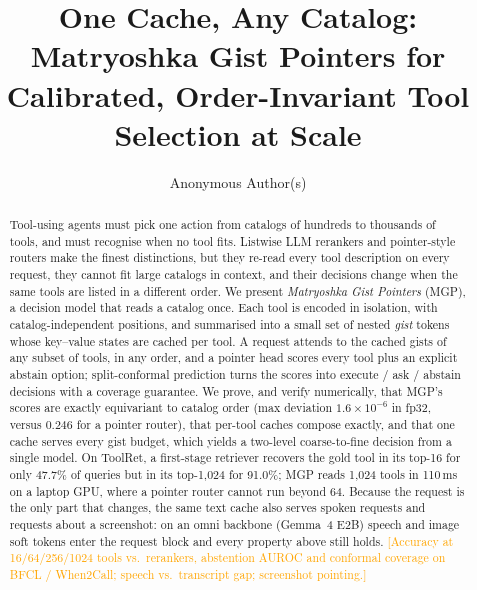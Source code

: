 \documentclass[sigconf,review,anonymous]{acmart}
\newcommand{\pending}[1]{\textcolor{orange}{[#1]}}
\newcommand{\method}{MGP}
\begin{document}
\title{One Cache, Any Catalog: Matryoshka Gist Pointers for Calibrated, Order-Invariant Tool Selection at Scale}

\author{Anonymous Author(s)}

\begin{abstract}
Tool-using agents must pick one action from catalogs of hundreds to thousands of tools, and must recognise when no tool fits.
Listwise LLM rerankers and pointer-style routers make the finest distinctions, but they re-read every tool description on every request, they cannot fit large catalogs in context, and their decisions change when the same tools are listed in a different order.
We present \emph{Matryoshka Gist Pointers} (\method{}), a decision model that reads a catalog once.
Each tool is encoded in isolation, with catalog-independent positions, and summarised into a small set of nested \emph{gist} tokens whose key--value states are cached per tool.
A request attends to the cached gists of any subset of tools, in any order, and a pointer head scores every tool plus an explicit abstain option; split-conformal prediction turns the scores into execute / ask / abstain decisions with a coverage guarantee.
We prove, and verify numerically, that \method{}'s scores are exactly equivariant to catalog order (max deviation $1.6\times10^{-6}$ in fp32, versus $0.246$ for a pointer router), that per-tool caches compose exactly, and that one cache serves every gist budget, which yields a two-level coarse-to-fine decision from a single model.
On ToolRet, a first-stage retriever recovers the gold tool in its top-16 for only 47.7\% of queries but in its top-1{,}024 for 91.0\%; \method{} reads 1{,}024 tools in 110\,ms on a laptop GPU, where a pointer router cannot run beyond 64.
Because the request is the only part that changes, the same text cache also serves spoken requests and requests about a screenshot: on an omni backbone (Gemma~4 E2B) speech and image soft tokens enter the request block and every property above still holds.
\pending{Accuracy at 16/64/256/1024 tools vs.\ rerankers, abstention AUROC and conformal coverage on BFCL / When2Call; speech vs.\ transcript gap; screenshot pointing.}
\end{abstract}


\maketitle
\end{document}
